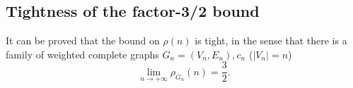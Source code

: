 \subsection{Tightness of the factor-3/2 bound}
It can be proved that the bound on $\rho(n)$ is tight, in the sense that there is a family of weighted complete graphs $G_n=(V_n,E_n),c_n$ ($|V_n|=n$)
\[\lim_{n\to+\infty}\rho_{G_n}(n)=\frac32.\]

